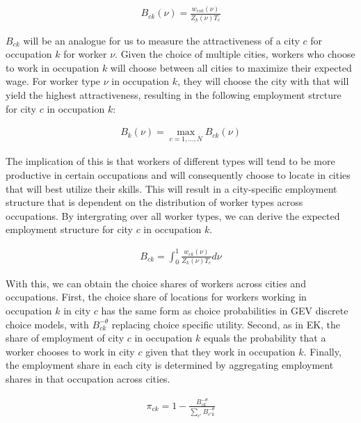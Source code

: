 \documentclass[10pt]{article}
\begin{document}
\begin{align}
    B_{ck}(\nu) = \frac{w_{csk}(\nu)}{Z_{k}(\nu)T_{c}}
\end{align}

$B_{ck}$ will be an analogue for us to measure the attractiveness of a city $c$ for occupation $k$ for worker $\nu$. Given the choice of multiple cities, workers who choose to work in occupation $k$ will choose between all cities to maximize their expected wage. For worker type $\nu$ in occupation $k$, they will choose the city with that will yield the highest attractiveness, resulting in the following employment strcture for city $c$ in occupation $k$:

\begin{align}
    B_k (\nu) = \max_{c = 1, \dots, N} B_{ck}(\nu)
\end{align}

The implication of this is that workers of different types will tend to be more productive in certain occupations and will consequently choose to locate in cities that will best utilize their skills. This will result in a city-specific employment structure that is dependent on the distribution of worker types across occupations. By intergrating over all worker types, we can derive the expected employment structure for city $c$ in occupation $k$.

\begin{align}
    B_{ck} = \int_{0}^{1} \frac{w_{ck}(\nu)}{Z_k (\nu) T_c} d\nu
\end{align}

With this, we can obtain the choice shares of workers across cities and occupations. First, the choice share of locations for workers working in occupation $k$ in city $c$ has the same form as choice probabilities in GEV discrete choice models, with $B_{ck}^{-\theta}$ replacing choice specific utility. Second, as in EK, the share of employment of city $c$ in occupation $k$ equals the probability that a worker chooses to work in city $c$ given that they work in occupation $k$. Finally, the employment share in each city is determined by aggregating employment shares in that occupation across cities.

\begin{align}
    \pi_{ck} = 1 - \frac{B_{ck}^{- \theta}}{\sum_{c'}^{} B_{c'k}^{- \theta}}
\end{align}
\end{document}
